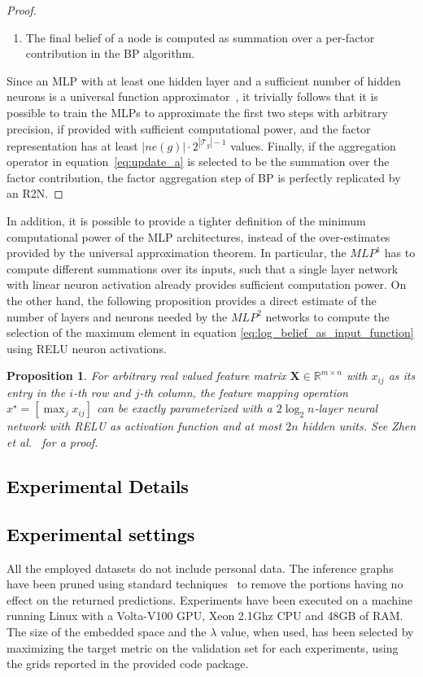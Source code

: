 \documentclass[journal]{IEEEtran}
\newtheorem{proposition}{Proposition}
\newcommand{\ar}[1]{\textcolor{black}{#1}}
\begin{document}
\begin{proof}
\begin{enumerate}
        \item The final belief of a node is computed as summation over a per-factor contribution in the BP algorithm.
	\end{enumerate}
	Since an MLP with at least one hidden layer and a sufficient number of hidden neurons is a universal function approximator~\cite{cybenko1992approximation, lu2017expressive}, it trivially follows that it is possible to train the MLPs to approximate the first two steps with arbitrary precision, if provided with sufficient computational power, and the factor representation has at least $|ne(g)| \cdot 2^{|\mathcal{T}_g| - 1}$ values.
	Finally, if the aggregation operator in equation~\ref{eq:update_a} is selected to be the summation over the factor contribution, the factor aggregation step of BP is perfectly replicated 
	by an R2N.
\end{proof}

In addition, it is possible to provide a tighter definition of the minimum computational power of the MLP architectures, instead of the over-estimates provided by the universal approximation theorem. In particular, the $MLP^1$ has to compute different summations over its inputs, such that a single layer network with linear neuron activation already provides sufficient computation power.
On the other hand, the following proposition provides a direct estimate of the number of layers and neurons needed by the $MLP^2$ networks to compute the selection of the maximum element in equation \ref{eq:log_belief_as_input_function} using RELU neuron activations.
\begin{proposition}
	\label{the:max_approx}
	For arbitrary real valued feature matrix $\mathbf{X} \in \mathbb{R}^{m \times n}$ with $x_{ij}$ as its entry in the $i$-th row and $j$-th column, the feature mapping operation $x^\star = [\max_j x_{ij} ]$ can be exactly parameterized with a $2 \log_2 n$-layer neural network with RELU as activation function and at most $2n$ hidden units. See Zhen et al.~\cite{zhen2020nips} for a proof.
\end{proposition}

\ar{\section*{Experimental Details}
\subsection*{Experimental settings}}
All the employed datasets do not include personal data. The inference graphs have been pruned using standard techniques~\cite{shavlik2009speeding} to remove the portions having no effect on the returned predictions.
Experiments have been executed on a machine running Linux with a Volta-V100 GPU, Xeon 2.1Ghz CPU and 48GB of RAM.
The size of the embedded space and the $\lambda$ value, when used, has been selected by maximizing the target metric on the validation set for each experiments, using the grids reported in the provided code package.
\end{document}
